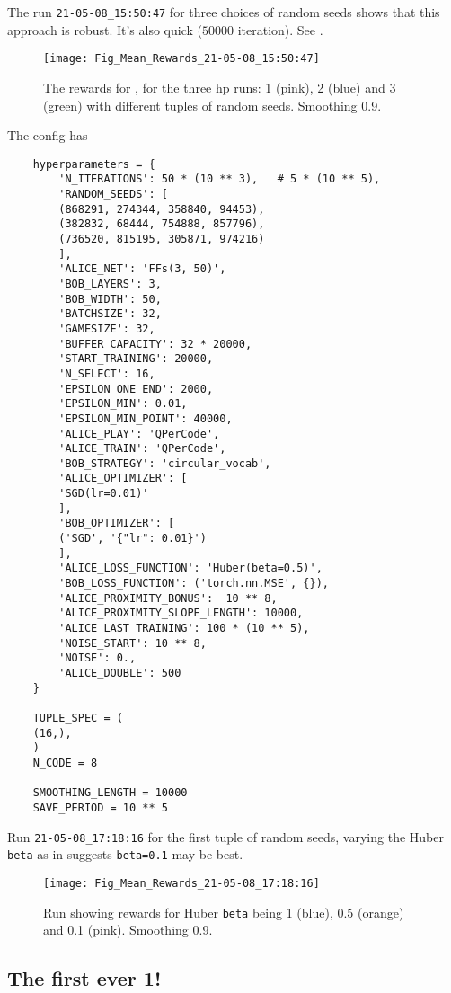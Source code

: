 \documentclass[12pt]{article}
\begin{document}
The run \verb|21-05-08_15:50:47| for three choices of random seeds shows that this approach is robust.  It's also quick ($\num{50000}$ iteration).  See .
\begin{figure}
	\centering
	\texttt{[image: Fig\_Mean\_Rewards\_21-05-08\_15:50:47]}
	\caption{The rewards for , for the three hp runs: 1 (pink), 2 (blue) and 3 (green) with different tuples of random seeds.  Smoothing 0.9.}
	\label{fig:figmeanrewards21-05-08155047}
\end{figure}
The config has
\begin{lstlisting}
	hyperparameters = {  
		'N_ITERATIONS': 50 * (10 ** 3),   # 5 * (10 ** 5),
		'RANDOM_SEEDS': [
		(868291, 274344, 358840, 94453),
		(382832, 68444, 754888, 857796),
		(736520, 815195, 305871, 974216)
		],
		'ALICE_NET': 'FFs(3, 50)',
		'BOB_LAYERS': 3,
		'BOB_WIDTH': 50,
		'BATCHSIZE': 32,
		'GAMESIZE': 32,
		'BUFFER_CAPACITY': 32 * 20000,
		'START_TRAINING': 20000,
		'N_SELECT': 16,
		'EPSILON_ONE_END': 2000,
		'EPSILON_MIN': 0.01,
		'EPSILON_MIN_POINT': 40000,
		'ALICE_PLAY': 'QPerCode',
		'ALICE_TRAIN': 'QPerCode',
		'BOB_STRATEGY': 'circular_vocab',
		'ALICE_OPTIMIZER': [
		'SGD(lr=0.01)'
		],
		'BOB_OPTIMIZER': [
		('SGD', '{"lr": 0.01}')
		],
		'ALICE_LOSS_FUNCTION': 'Huber(beta=0.5)',
		'BOB_LOSS_FUNCTION': ('torch.nn.MSE', {}), 
		'ALICE_PROXIMITY_BONUS':  10 ** 8, 
		'ALICE_PROXIMITY_SLOPE_LENGTH': 10000,
		'ALICE_LAST_TRAINING': 100 * (10 ** 5),
		'NOISE_START': 10 ** 8,
		'NOISE': 0.,
		'ALICE_DOUBLE': 500
	}
	
	TUPLE_SPEC = (
	(16,),
	)
	N_CODE = 8
	
	SMOOTHING_LENGTH = 10000
	SAVE_PERIOD = 10 ** 5
\end{lstlisting}

Run \verb|21-05-08_17:18:16| for the first tuple of random seeds, varying the Huber \verb|beta| as in  suggests \verb|beta=0.1| may be best.
\begin{figure}
	\centering
	\texttt{[image: Fig\_Mean\_Rewards\_21-05-08\_17:18:16]}
	\caption{Run  showing rewards for Huber \texttt{beta} being 1 (blue), 0.5 (orange) and 0.1 (pink). Smoothing 0.9.}
	\label{fig:figmeanrewards21-05-08171816}
\end{figure}

\subsection{The first ever 1!}
\end{document}
